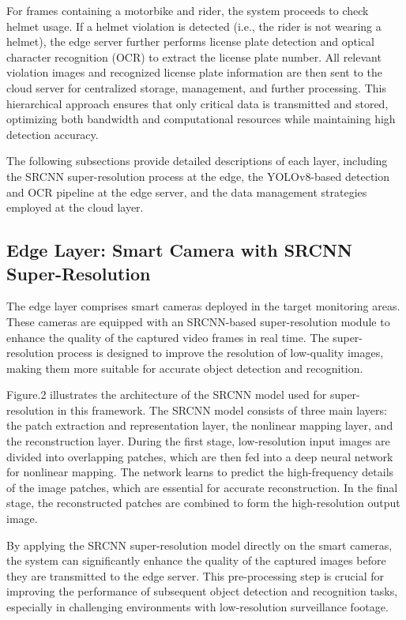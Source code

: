 \documentclass[conference]{IEEEtran}
\begin{document}
For frames containing a motorbike and rider, the system proceeds to check helmet usage. If a helmet violation is detected (i.e., the rider is not wearing a helmet), the edge server further performs license plate detection and optical character recognition (OCR) to extract the license plate number. All relevant violation images and recognized license plate information are then sent to the cloud server for centralized storage, management, and further processing. This hierarchical approach ensures that only critical data is transmitted and stored, optimizing both bandwidth and computational resources while maintaining high detection accuracy.

The following subsections provide detailed descriptions of each layer, including the SRCNN super-resolution process at the edge, the YOLOv8-based detection and OCR pipeline at the edge server, and the data management strategies employed at the cloud layer.

\subsection{Edge Layer: Smart Camera with SRCNN Super-Resolution}
\label{subsec:edge_layer}

The edge layer comprises smart cameras deployed in the target monitoring areas. These cameras are equipped with an SRCNN-based super-resolution module to enhance the quality of the captured video frames in real time. The super-resolution process is designed to improve the resolution of low-quality images, making them more suitable for accurate object detection and recognition.

Figure.2 illustrates the architecture of the SRCNN model used for super-resolution in this framework. The SRCNN model consists of three main layers: the patch extraction and representation layer, the nonlinear mapping layer, and the reconstruction layer. During the first stage, low-resolution input images are divided into overlapping patches, which are then fed into a deep neural network for nonlinear mapping. The network learns to predict the high-frequency details of the image patches, which are essential for accurate reconstruction. In the final stage, the reconstructed patches are combined to form the high-resolution output image.

By applying the SRCNN super-resolution model directly on the smart cameras, the system can significantly enhance the quality of the captured images before they are transmitted to the edge server. This pre-processing step is crucial for improving the performance of subsequent object detection and recognition tasks, especially in challenging environments with low-resolution surveillance footage.
\end{document}
